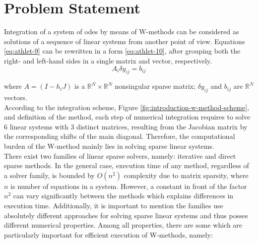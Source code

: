 \chapter{Problem Statement}\label{chapter:problem-statment}


Integration of a system of \acrshort{ode}s by means of W-methods can be considered as solutions of a sequence of linear systems from another point of view. Equations \ref{eq:athlet-9} can be rewritten in a form \ref{eq:athlet-10}, after grouping both the right- and left-hand sides in a single matrix and vector, respectively.\\



\begin{equation} \label{eq:athlet-10}
	A_{i} \delta y_{ij} =  b_{ij} 
\end{equation}


where $A = (I - h_{i}J)$  is a $\mathbb{R}^{N} \times \mathbb{R}^{N}$ nonsingular sparse matrix; $\delta y_{ij}$  and $b_{ij}$ are $\mathbb{R}^{N}$ vectors.\\


According to the integration scheme, Figure \ref{fig:introduction-w-method-scheme}, and definition of the method, each step of numerical integration requires to solve 6 linear systems with 3 distinct matrices, resulting from the Jacobian matrix by the corresponding shifts of the main diagonal. Therefore, the computational burden of the W-method mainly lies in solving sparse linear systems.\\


There exist two families of linear sparse solvers, namely: iterative and direct sparse methods. In the general case, execution time of any method, regardless of a solver family, is bounded by $O(n^2)$ complexity due to matrix sparsity, where $n$ is number of equations in a system. However, a constant in front of the factor $n^2$ can vary significantly between the methods which explains differences in execution time. Additionally, it is important to mention the families use absolutely different approaches for solving sparse linear systems and thus posses different numerical properties. Among all  properties, there are some which are particularly important for efficient execution of W-methods, namely: \\


